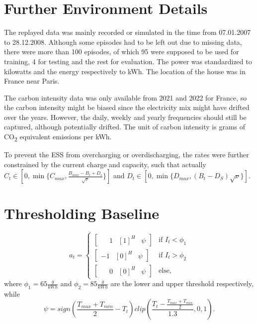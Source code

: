 
\section{Further Environment Details} \label{sec:environment_details}
The replayed data was mainly recorded or simulated  in the time from 07.01.2007 to 28.12.2008. Although some episodes had to be left out due to missing data, there were more than 100 episodes, of which 95 were supposed to be used for training, 4 for testing and the rest for evaluation. The power was standardized to kilowatts and the energy respectively to kWh. The location of the house was in France near Paris.
\par
The carbon intensity data was only available from 2021 and 2022 for France, so the carbon intensity might be biased since the electricity mix might have drifted over the years. However, the daily, weekly and yearly frequencies should still be captured, although potentially drifted. The unit of carbon intensity is grams of CO\textsubscript{2} equivalent emissions per kWh.
\par To prevent the ESS from overcharging or overdischarging, the rates were further constrained by the current charge and capacity, such that actually $C_t \in [0, \min\{C_{max}, \frac{B_{max} - B_t + D_s}{\sqrt{\nu}}\}]$ and $D_t \in [0, \min\{D_{max}, (B_t - D_S) \sqrt{\nu}\}]$.

\section{Thresholding Baseline} \label{sec:thresholding_baseline}
\begin{equation}
    a_t = \left\{
        \begin{array}{ll}
            \begin{bmatrix} \phantom{-}1 & [1]^H & \psi \end{bmatrix} & \text{if } I_t < \phi_1 \\
            \begin{bmatrix} -1 & [0]^H & \psi \end{bmatrix} & \text{if } I_t > \phi_2 \\
            \begin{bmatrix} \phantom{-}0 & [0]^H & \psi \end{bmatrix} & \text{else,}
        \end{array}
    \right.
\end{equation}
where $\phi_1 = 65 \frac{g}{kWh}$ and $\phi_2 = 85 \frac{g}{kWh}$ are the lower and upper threshold respectively, while 
\begin{equation}
    \psi = sign(\frac{T_{max}+T_{min}}{2} - T_{t}) clip(\frac{T_t-\frac{T_{max}+T_{min}}{2}}{1.3},0,1).
\end{equation}

